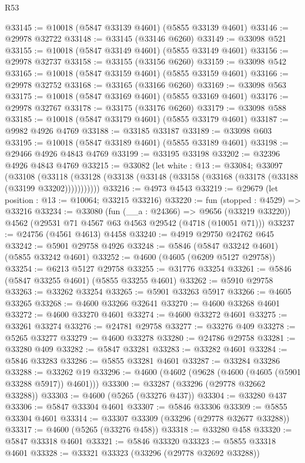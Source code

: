 \begin{lexlean}{R53}
\begin{coremodule}
@33145 := @10018 (@5847 @33139 @4601) (@5855 @33139 @4601)
@33146 := @29978 @32722
@33148 := @33145 (@33146 @6260)
@33149 := @33098 @521
@33155 := @10018 (@5847 @33149 @4601) (@5855 @33149 @4601)
@33156 := @29978 @32737
@33158 := @33155 (@33156 @6260)
@33159 := @33098 @542
@33165 := @10018 (@5847 @33159 @4601) (@5855 @33159 @4601)
@33166 := @29978 @32752
@33168 := @33165 (@33166 @6260)
@33169 := @33098 @563
@33175 := @10018 (@5847 @33169 @4601) (@5855 @33169 @4601)
@33176 := @29978 @32767
@33178 := @33175 (@33176 @6260)
@33179 := @33098 @588
@33185 := @10018 (@5847 @33179 @4601) (@5855 @33179 @4601)
@33187 := @9982 @4926 @4769
@33188 := @33185 @33187
@33189 := @33098 @603
@33195 := @10018 (@5847 @33189 @4601) (@5855 @33189 @4601)
@33198 := @29466 @4926 @4843 @4769
@33199 := @33195 @33198
@33202 := @32396 @4926 @4843 @4769
@33215 := @33082
    (let white : @13 := @33084;
    @33097
      (@33108
        (@33118 (@33128 (@33138 (@33148 (@33158 (@33168 (@33178 (@33188 (@33199 @33202)))))))))))
@33216 := @4973 @4543
@33219 := @29679 (let position : @13 := @10064; @33215 @33216)
@33220 := fun (stopped : @4529) => @33216
@33234 := @33080
    (fun (__a : @24366) => @9656 (@33219 @33220))
    @4562
    (@29531 @71 @4567 @63 @4563 @29542 (@4718 (@10051 @71)))
@33237 := @24756 (@4561 @4613) @4458
@33240 := @4919 @29750 @24762 @645
@33242 := @5901 @29758 @4926
@33248 := @5846 (@5847 @33242 @4601) (@5855 @33242 @4601)
@33252 := @4600 (@4605 (@6209 @5127 @29758))
@33254 := @6213 @5127 @29758
@33255 := @31776 @33254
@33261 := @5846 (@5847 @33255 @4601) (@5855 @33255 @4601)
@33262 := @5910 @29758
@33263 := @33262 @33254
@33265 := @5901 @33263 @5917
@33266 := @4605 @33265
@33268 := @4600 @33266 @32641
@33270 := @4600 @33268 @4601
@33272 := @4600 @33270 @4601
@33274 := @4600 @33272 @4601
@33275 := @33261 @33274
@33276 := @24781 @29758
@33277 := @33276 @409
@33278 := @5265 @33277
@33279 := @4600 @33278
@33280 := @24786 @29758
@33281 := @33280 @409
@33282 := @5847 @33281
@33283 := @33282 @4601
@33284 := @5846 @33283
@33286 := @5855 @33281 @4601
@33287 := @33284 @33286
@33288 := @33262 @19
@33296 := @4600 (@4602 (@9628 (@4600 (@4605 (@5901 @33288 @5917)) @4601)))
@33300 := @33287 (@33296 (@29778 @32662 @33288))
@33303 := @4600 (@5265 (@33276 @437))
@33304 := @33280 @437
@33306 := @5847 @33304 @4601
@33307 := @5846 @33306
@33309 := @5855 @33304 @4601
@33314 := @33307 @33309 (@33296 (@29778 @32677 @33288))
@33317 := @4600 (@5265 (@33276 @458))
@33318 := @33280 @458
@33320 := @5847 @33318 @4601
@33321 := @5846 @33320
@33323 := @5855 @33318 @4601
@33328 := @33321 @33323 (@33296 (@29778 @32692 @33288))

\end{coremodule}
\end{lexlean}
